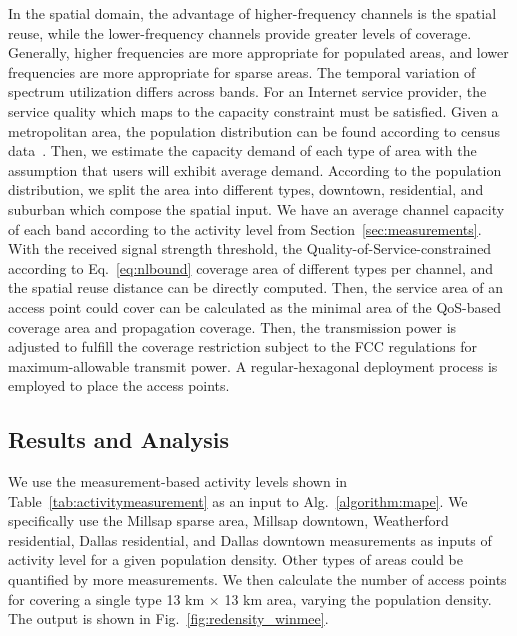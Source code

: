 In the spatial domain, the advantage of higher-frequency channels is the spatial reuse, while the lower-frequency 
channels provide greater levels of coverage. Generally, higher frequencies are more appropriate for populated 
areas, and lower frequencies are more appropriate for sparse areas. The temporal variation of spectrum utilization 
differs across bands. For an Internet service provider, the service quality which maps to the capacity constraint 
must be satisfied. Given a metropolitan area, the population distribution can be found according to census data~\cite{uscensus}. 
Then, we estimate the capacity demand of each type of area with the assumption that users 
will exhibit average demand. According to the population distribution, we split the area into different types, 
downtown, residential, and suburban which compose the spatial input. 
We have an average 
channel capacity of each band according to the activity level from Section~\ref{sec:measurements}. 
With the received signal strength threshold, the 
Quality-of-Service-constrained according to Eq.~\ref{eq:nlbound} coverage area of different types per channel, and the spatial reuse distance can be 
directly computed. Then, the service area of an access point could cover can be calculated as the minimal area of the 
QoS-based coverage area and propagation coverage. Then, the transmission power is adjusted to fulfill the coverage 
restriction subject to the FCC regulations for maximum-allowable transmit power. A regular-hexagonal deployment 
process is employed to place the access points. 

\subsection{Results and Analysis}
\label{subsec:winmeeresult}

We use the measurement-based activity levels shown in Table~\ref{tab:activitymeasurement} as an input to 
Alg.~\ref{algorithm:mape}. We specifically use the Millsap sparse area, Millsap downtown, Weatherford residential, 
Dallas residential, and Dallas downtown measurements as inputs of activity level for a given population density. 
Other types of areas could be quantified by more measurements.
We then 
calculate the number of access points for covering a single type 13 km $\times$ 13 km area, varying the population density. The 
output is shown in Fig.~\ref{fig:redensity_winmee}. 


